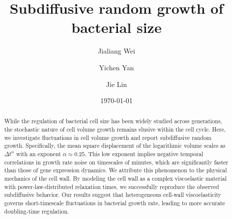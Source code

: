 \documentclass[aps, prl, twocolumn, longbibliography, linenumbers, superscriptaddress]{revtex4-2}
\newcommand{\blue}{\color{blue}}
\begin{document}
\title{Subdiffusive random growth of bacterial size}

\author{Jialiang Wei}
\author{Yichen Yan}
\author{Jie Lin}
\date{\today}
\begin{abstract}
While the regulation of bacterial cell size has been widely studied across generations, the stochastic nature of cell volume growth remains elusive within the cell cycle. Here, we investigate fluctuations in cell volume growth and report subdiffusive random growth. Specifically, the mean square displacement of the logarithmic volume scales as $\Delta t^\alpha$ with an exponent $\alpha \approx 0.25$. This low exponent implies negative temporal correlations in growth rate noise on timescales of minutes, which are significantly faster than those of gene expression dynamics. We attribute this phenomenon to the physical mechanics of the cell wall. By modeling the cell wall as a complex viscoelastic material with power-law-distributed relaxation times, we successfully reproduce the observed subdiffusive behavior. {\blue Our results suggest that heterogeneous cell-wall viscoelasticity governs short-timescale fluctuations in bacterial growth rate, leading to more accurate doubling-time regulation.}
\end{abstract}
\maketitle

\end{document}

